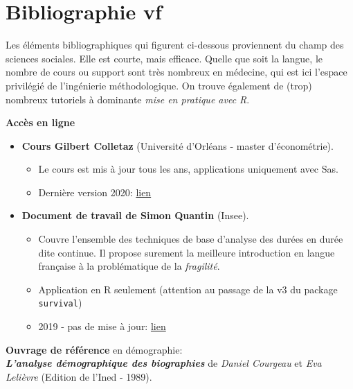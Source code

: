 \documentclass[
  12pt,
  letterpaper,
  DIV=11,
  numbers=noendperiod,
  onepage,
  openany]{scrreprt}
\providecommand{\tightlist}{%
  \setlength{\itemsep}{0pt}\setlength{\parskip}{0pt}}\usepackage{longtable,booktabs,array}
\begin{document}
\hypertarget{bibliographie-vf}{%
\section*{Bibliographie vf}\label{bibliographie-vf}}


Les éléments bibliographiques qui figurent ci-dessous proviennent du
champ des sciences sociales. Elle est courte, mais efficace. Quelle que
soit la langue, le nombre de cours ou support sont très nombreux en
médecine, qui est ici l'espace privilégié de l'ingénierie
méthodologique. On trouve également de (trop) nombreux tutoriels à
dominante \emph{mise en pratique avec R}.

\textbf{Accès en ligne}

\begin{itemize}
\tightlist
\item
  \textbf{Cours Gilbert Colletaz} (Université d'Orléans - master
  d'économétrie).

  \begin{itemize}
  \tightlist
  \item
    Le cours est mis à jour tous les ans, applications uniquement avec
    Sas.
  \item
    Dernière version 2020:
    \href{https://www.master-esa.fr/wp-content/uploads/2021/04/Econometrie-des-donnees-de-survie.pdf}{lien}
  \end{itemize}
\item
  \textbf{Document de travail de Simon Quantin} (Insee).

  \begin{itemize}
  \tightlist
  \item
    Couvre l'ensemble des techniques de base d'analyse des durées en
    durée dite continue. Il propose surement la meilleure introduction
    en langue française à la problématique de la \emph{fragilité}.
  \item
    Application en R seulement (attention au passage de la v3 du package
    \texttt{survival})
  \item
    2019 - pas de mise à jour:
    \href{https://www.insee.fr/fr/statistiques/3695681}{lien}
  \end{itemize}
\end{itemize}

\textbf{Ouvrage de référence} en démographie:\\
\textbf{\emph{L'analyse démographique des biographies}} de \emph{Daniel
Courgeau} et \emph{Eva Lelièvre} (Edition de l'Ined - 1989).
\end{document}

